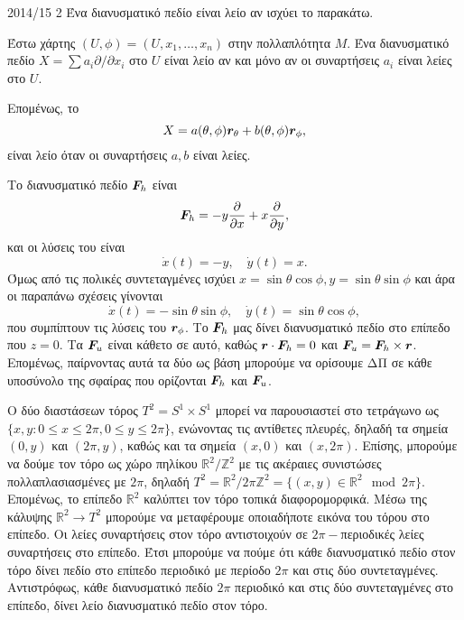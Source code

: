 \documentclass[a4paper,11pt]{article}
\begin{document}
\begin{solution}{2014/15 2}
    Ένα διανυσματικό πεδίο είναι λείο αν ισχύει το παρακάτω.
    \begin{lemma}
        Έστω χάρτης \( (U, \phi) = (U, x_1, \dots, x_n) \) στην
        πολλαπλότητα \( M \). Ένα διανυσματικό πεδίο \( X = \sum a_i
        \partial/\partial x_i \) στο \(U\) είναι λείο αν και μόνο αν οι
        συναρτήσεις \( a_i \) είναι λείες στο \( U \).
    \end{lemma}
    Επομένως, το
    \begin{equation*}
        X = a(\theta, \phi)\bm{r}_{\theta} + b(\theta, \phi)\bm{r}_{\phi},
    \end{equation*}
    είναι λείο όταν οι συναρτήσεις \(a, b\) είναι λείες.

    Το διανυσματικό πεδίο \( \bm{F}_h \) είναι
    \begin{equation*}
        \bm{F}_h = -y \frac{\partial}{\partial x} + x \frac{\partial}{\partial
        y},
    \end{equation*}
    και οι λύσεις του είναι
    \begin{equation*}
        \dot{x}(t) = -y, \quad \dot{y}(t) = x.
    \end{equation*}
    Όμως από τις πολικές συντεταγμένες ισχύει \( x = \sin{\theta}\cos{\phi},
    y = \sin{\theta}\sin{\phi} \) και άρα οι παραπάνω σχέσεις γίνονται
    \begin{equation*}
        \dot{x}(t) = -\sin{\theta}\sin{\phi} , \quad \dot{y}(t) = \sin{\theta}\cos{\phi},
    \end{equation*}
    που συμπίπτουν τις λύσεις του \( \bm{r}_{\phi} \).
    Το \( \bm{F}_h \) μας δίνει διανυσματικό πεδίο στο επίπεδο που \( z = 0 \). Τα
    \( \bm{F}_u \) είναι κάθετο σε αυτό, καθώς \( \bm{r} \cdot \bm{F}_h = 0 \)
    και \( \bm{F}_u = \bm{F}_h \times \bm{r} \). Επομένως, παίρνοντας αυτά τα δύο ως
    βάση μπορούμε να ορίσουμε ΔΠ σε κάθε υποσύνολο της σφαίρας που ορίζονται
    \( \bm{F}_h \) και \( \bm{F}_u \).

    Ο δύο διαστάσεων τόρος \(T^2 = S^1 \times S^1\) μπορεί να παρουσιαστεί στο
    τετράγωνο ως \( \{x,y: 0 \leq x \leq 2\pi, 0 \leq y \leq 2\pi \} \),
    ενώνοντας τις αντίθετες πλευρές, δηλαδή τα σημεία \( (0, y) \) και \( (2\pi,
    y) \), καθώς και τα σημεία \( (x,0) \) και \( (x, 2\pi) \). Επίσης, μπορούμε
    να δούμε τον τόρο ως χώρο πηλίκου \( \mathbb{R}^2 / \mathbb{Z}^2 \) με τις
    ακέραιες συνιστώσες πολλαπλασιασμένες με \(2\pi\), δηλαδή \(T^2 =
        \mathbb{R}^2/ 2\pi\mathbb{Z}^2 = \{ (x, y) \in \mathbb{R}^2 \mod 2\pi \}
    \). Επομένως, το επίπεδο \(\mathbb{R}^2\) καλύπτει τον τόρο τοπικά
    διαφορομορφικά. Μέσω της κάλυψης \(\mathbb{R}^2 \to T^2\) μπορούμε να
    μεταφέρουμε οποιαδήποτε εικόνα του τόρου στο επίπεδο. Οι λείες συναρτήσεις
    στον τόρο αντιστοιχούν σε \(2\pi-\)περιοδικές λείες συναρτήσεις στο επίπεδο.
    Έτσι μπορούμε να πούμε ότι κάθε διανυσματικό πεδίο στον τόρο δίνει πεδίο στο
    επίπεδο περιοδικό με περίοδο \(2\pi\) και στις δύο συντεταγμένες.
    Αντιστρόφως, κάθε διανυσματικό πεδίο \(2\pi\) περιοδικό και στις δύο
    συντεταγμένες στο επίπεδο, δίνει λείο διανυσματικό πεδίο στον τόρο.
\end{solution}
\end{document}
